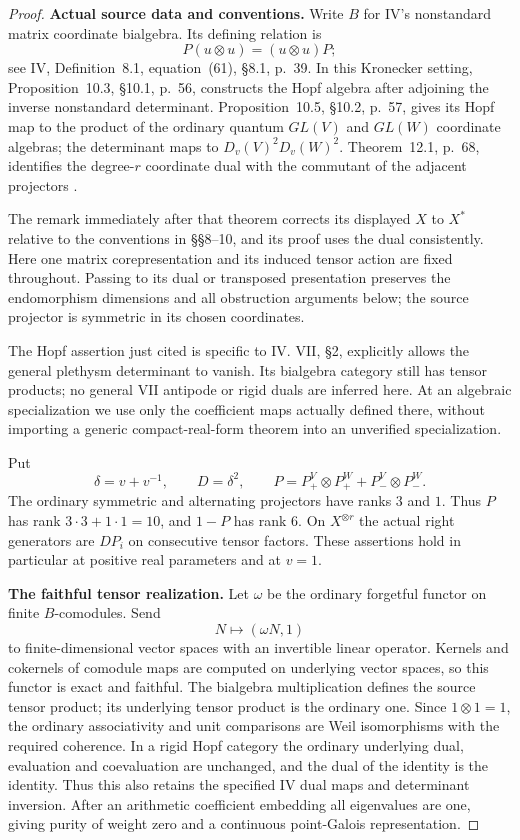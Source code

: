 \begin{proof}
\par\smallskip\noindent\textbf{Actual source data and conventions.}\quad
Write $B$ for IV's nonstandard matrix coordinate bialgebra.
Its defining relation is
\[
 P(u\otimes u)=(u\otimes u)P;
\]
see IV, Definition~8.1, equation~(61), \S8.1, p.~39.
In this Kronecker setting, Proposition~10.3, \S10.1, p.~56,
constructs the Hopf algebra after adjoining the inverse
nonstandard determinant. Proposition~10.5, \S10.2, p.~57,
gives its Hopf map to the product of the ordinary quantum
$GL(V)$ and $GL(W)$ coordinate algebras; the determinant
maps to $D_v(V)^2D_v(W)^2$.
Theorem~12.1, p.~68, identifies the degree-$r$ coordinate
dual with the commutant of the adjacent projectors
\cite{IV}.

The remark immediately after that theorem corrects its
displayed $X$ to $X^*$ relative to the conventions in
\S\S8--10, and its proof uses the dual consistently.
Here one matrix corepresentation and its induced tensor
action are fixed throughout. Passing to its dual or
transposed presentation preserves the endomorphism
dimensions and all obstruction arguments below; the
source projector is symmetric in its chosen coordinates.

The Hopf assertion just cited is specific to IV.
VII, \S2, explicitly allows the general plethysm determinant
to vanish. Its bialgebra category still has tensor products;
no general VII antipode or rigid duals are inferred here.
At an algebraic specialization we use only the coefficient
maps actually defined there, without importing a generic
compact-real-form theorem into an unverified specialization.

Put
\[
 \delta=v+v^{-1},\qquad D=\delta^2,\qquad
 P=P_+^V\otimes P_+^W+P_-^V\otimes P_-^W.
\]
The ordinary symmetric and alternating projectors have ranks
$3$ and $1$. Thus $P$ has rank $3\cdot3+1\cdot1=10$,
and $1-P$ has rank $6$. On $X^{\otimes r}$ the actual
right generators are $DP_i$ on consecutive tensor factors.
These assertions hold in particular at positive real
parameters and at $v=1$.

\par\smallskip\noindent\textbf{The faithful tensor realization.}\quad
Let $\omega$ be the ordinary forgetful functor on finite
$B$-comodules. Send
\[
 N\longmapsto(\omega N,1)
\]
to finite-dimensional vector spaces with an invertible
linear operator. Kernels and cokernels of comodule maps
are computed on underlying vector spaces, so this functor
is exact and faithful. The bialgebra multiplication defines
the source tensor product; its underlying tensor product
is the ordinary one. Since $1\otimes1=1$, the ordinary
associativity and unit comparisons are Weil isomorphisms
with the required coherence.
In a rigid Hopf category the ordinary underlying dual,
evaluation and coevaluation are unchanged, and the dual
of the identity is the identity. Thus this also retains
the specified IV dual maps and determinant inversion.
After an arithmetic coefficient embedding all eigenvalues
are one, giving purity of weight zero and a continuous
point-Galois representation.


\end{proof}

